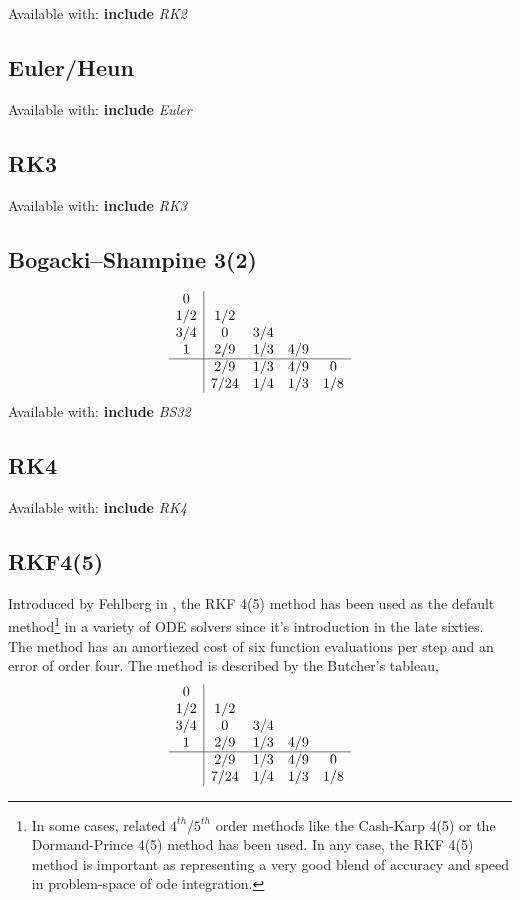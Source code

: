 \documentclass[letterpaper,10pt]{book}
\newcommand{\srcas}[1]{Available with: \textbf{include} \textlangle{}\textit{#1}\textrangle{}}
\begin{document}
	\srcas{RK2}

      \subsection{Euler/Heun}
    
    	\srcas{Euler}

      \subsection{RK3}
	\srcas{RK3}
    
    
      \subsection{Bogacki–Shampine 3(2)}
	\[
	  \begin{array}{c|cccc}
	    0 & & & &\\
	    1/2 & 1/2 & & &\\
	    3/4 & 0 & 3/4 & &\\	    
	    1 & 2/9 & 1/3 & 4/9 &\\	    
	    \hline
	    & 2/9 & 1/3 & 4/9 & 0\\
	    & 7/24 & 1/4 & 1/3 & 1/8\\
	  \end{array}
	\]    
    	\srcas{BS32}

    
      \subsection{RK4}
    	\srcas{RK4}

    
      \subsection{RKF4(5)}
	Introduced by Fehlberg in \cite{fehlberg1969low}, the RKF 4(5) method has been used as the default method\footnote{In some cases, related $4^{th}$/$5^{th}$ order methods like the Cash-Karp 4(5) or the Dormand-Prince 4(5) method has been used.  In any case, the RKF 4(5) method is important as representing a very good blend of accuracy and speed in problem-space of ode integration.} in a variety of ODE solvers since it's introduction in the late sixties.  The method has an amortiezed cost of six function evaluations per step and an error of order four.  The method is described by the Butcher's tableau,
	\[
	  \begin{array}{c|cccc}
	    0 & & & &\\
	    1/2 & 1/2 & & &\\
	    3/4 & 0 & 3/4 & &\\	    
	    1 & 2/9 & 1/3 & 4/9 &\\	    
	    \hline
	    & 2/9 & 1/3 & 4/9 & 0\\
	    & 7/24 & 1/4 & 1/3 & 1/8\\
	  \end{array}
	\]
	
\end{document}
